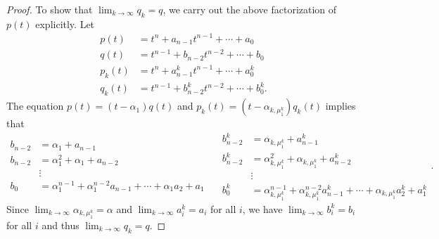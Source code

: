 \documentclass[10pt]{report}
\theoremstyle{definition}
\begin{document}
\begin{proof}{}
To show that $\lim_{k\to\infty}q_k=q$, we carry out the above factorization of $p(t)$ explicitly. Let
\begin{align*}
p(t)&=t^n+a_{n-1}t^{n-1}+\cdots+a_0\\
q(t)&=t^{n-1}+b_{n-2}t^{n-2}+\cdots+b_0\\
p_k(t)&=t^n+a^k_{n-1}t^{n-1}+\cdots+a^k_0\\
q_k(t)&=t^{n-1}+b^k_{n-2}t^{n-2}+\cdots+b^k_0.
\end{align*}
The equation $p(t)=(t-\alpha_1)q(t)$ and $p_k(t)=(t-\alpha_{k,\mu^k_1})q_k(t)$ implies that
$$
\begin{aligned}
b_{n-2}&=\alpha_1+a_{n-1}\\
b_{n-2}&=\alpha_1^2+\alpha_1+a_{n-2}\\
&{ }\mathbin{\vdots}{ }\\
b_0&=\alpha_1^{n-1}+\alpha_1^{n-2}a_{n-1}+\cdots+\alpha_1a_2+a_1
\end{aligned}\quad
\begin{aligned}
b^k_{n-2}&=\alpha_{k,\mu^k_1}+a^k_{n-1}\\
b^k_{n-2}&=\alpha_{k,\mu^k_1}^2+\alpha_{k,\mu^k_1}+a^k_{n-2}\\
&{ }\mathbin{\vdots}{ }\\
b^k_0&=\alpha_{k,\mu^k_1}^{n-1}+\alpha_{k,\mu^k_1}^{n-2}a^k_{n-1}+\cdots+\alpha_{k,\mu^k_1}a^k_2+a^k_1
\end{aligned}.
$$
Since $\lim_{k\to\infty}\alpha_{k,\mu^k_1}=\alpha$ and $\lim_{k\to\infty}a^k_i=a_i$ for all $i$, we have $\lim_{k\to\infty}b^k_i=b_i$ for all $i$ and thus $\lim_{k\to\infty}q_k=q$.
\end{proof}
\end{document}
